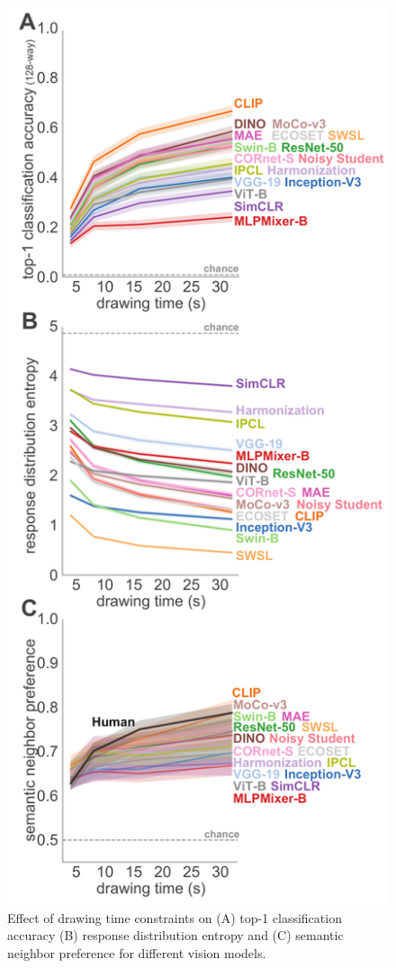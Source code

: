\documentclass{article}
\begin{document}
\begin{figure}
    
    \centering

    \includegraphics[width=.4\textwidth]{neurips_figures/neuripds_entropy_accuracy_dd_snp_v3_vertical.pdf}
    \caption{Effect of drawing time constraints on (A) top-1 classification accuracy (B) response distribution entropy and (C) semantic neighbor preference for different vision models. }
    \label{fig:accuracy_entropy_snp}
    \vspace{-2em}
\end{figure}
\end{document}
